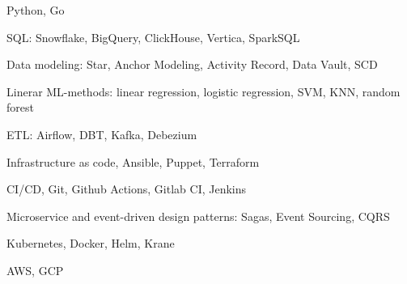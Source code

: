 \item Python, Go
\item SQL: Snowflake, BigQuery, ClickHouse, Vertica, SparkSQL
\item Data modeling: Star, Anchor Modeling, Activity Record, Data Vault, SCD
\item Linerar ML-methods: linear regression, logistic regression, SVM, KNN,
  random forest
\item ETL: Airflow, DBT, Kafka, Debezium
\item Infrastructure as code, Ansible, Puppet, Terraform
\item CI/CD, Git, Github Actions, Gitlab CI, Jenkins
\item Microservice and event-driven design patterns: Sagas, Event Sourcing,
  CQRS
\item Kubernetes, Docker, Helm, Krane
\item AWS, GCP
